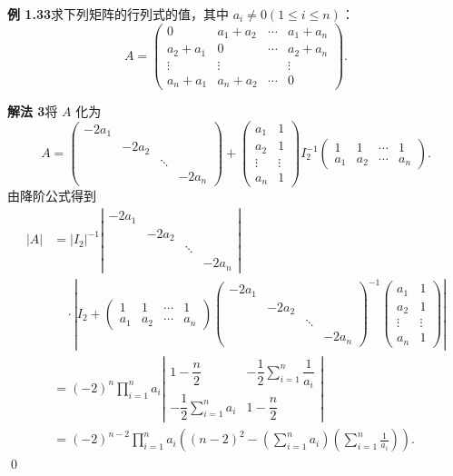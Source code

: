 \documentclass[UTF8,12pt,a4paper,fontset=fandol]{ctexart}
\begin{document}
\noindent\textbf{例 1.33}\quad 求下列矩阵的行列式的值，其中 $a_i\ne0(1\le i\le n)$：
\[
A=
\left(
\begin{array}{cccc}
0 & a_1+a_2 & \cdots & a_1+a_n\\
a_2+a_1 & 0 & \cdots & a_2+a_n\\
\vdots & \vdots & & \vdots\\
a_n+a_1 & a_n+a_2 & \cdots & 0
\end{array}
\right).
\]

\noindent\textbf{解法 3}\quad 将 $A$ 化为
\[
A=
\left(
\begin{array}{cccc}
-2a_1 & & &\\
& -2a_2 & &\\
& & \ddots &\\
& & & -2a_n
\end{array}
\right)
+
\left(
\begin{array}{cc}
a_1 & 1\\
a_2 & 1\\
\vdots & \vdots\\
a_n & 1
\end{array}
\right)
I_2^{-1}
\left(
\begin{array}{cccc}
1 & 1 & \cdots & 1\\
a_1 & a_2 & \cdots & a_n
\end{array}
\right).
\]
由降阶公式得到
\[
\begin{aligned}
|A|
&=|I_2|^{-1}
\left|
\begin{array}{cccc}
-2a_1 & & &\\
& -2a_2 & &\\
& & \ddots &\\
& & & -2a_n
\end{array}
\right|\\
&\quad\cdot
\left|
I_2+
\left(
\begin{array}{cccc}
1 & 1 & \cdots & 1\\
a_1 & a_2 & \cdots & a_n
\end{array}
\right)
\left(
\begin{array}{cccc}
-2a_1 & & &\\
& -2a_2 & &\\
& & \ddots &\\
& & & -2a_n
\end{array}
\right)^{-1}
\left(
\begin{array}{cc}
a_1 & 1\\
a_2 & 1\\
\vdots & \vdots\\
a_n & 1
\end{array}
\right)
\right|\\
&=(-2)^n\prod_{i=1}^n a_i
\left|
\begin{array}{cc}
1-\dfrac n2 & -\dfrac12\sum\limits_{i=1}^n\dfrac1{a_i}\\
-\dfrac12\sum\limits_{i=1}^n a_i & 1-\dfrac n2
\end{array}
\right|\\
&=(-2)^{n-2}\prod_{i=1}^n a_i
\left((n-2)^2-\left(\sum_{i=1}^n a_i\right)
\left(\sum_{i=1}^n\frac1{a_i}\right)\right).
\end{aligned}
\]
\qed
\end{document}
